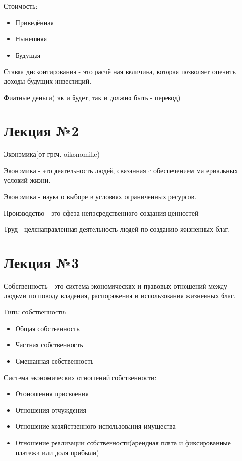 \documentclass[a4paper, 12pt]{article}
\begin{document}
	Стоимость:
	\begin{itemize}
		\item Приведённая
		\item Нынешняя
		\item Будущая
	\end{itemize}

	Ставка дисконтирования - это расчётная величина, которая позволяет оценить доходы будущих инвестиций.
	
	Фиатные деньги(так и будет, так и должно быть - перевод)

	\part*{Лекция №2}
	
	Экономика(от греч. oikonomike)
	
	Экономика - это деятельность людей, связанная с обеспечением материальных условий жизни.
	
	Экономика - наука о выборе в условиях ограниченных ресурсов.
	
	Производство - это сфера непосредственного создания ценностей
	
	Труд - целенаправленная деятельность людей по созданию жизненных благ.
	
	\part*{Лекция №3}
	
	Собственность - это система экономических и правовых отношений между людьми по поводу владения, распоряжения и использования жизненных благ.
	
	Типы собственности:
	\begin{itemize}
		\item Общая собственность
		\item Частная собственность
		\item Смешанная собственность
	\end{itemize}
	
	Система экономических отношений собственности:
	\begin{itemize}
		\item Отоношения присвоения
		\item Отношения отчуждения
		\item Отношение хозяйственного использования имущества
		\item Отношение реализации собственности(арендная плата и фиксированные платежи или доля прибыли)
	\end{itemize}
\end{document}
